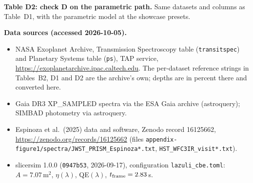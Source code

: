 \documentclass[11pt]{article}
\begin{document}
\textbf{Table D2: check D on the parametric path.} Same datasets and columns as Table~D1, with the parametric model at the showcase presets.



\textbf{Data sources (accessed 2026-10-05).}
\begin{itemize}[leftmargin=*,itemsep=0pt]\small
  \item NASA Exoplanet Archive, Transmission Spectroscopy table (\texttt{transitspec}) and Planetary Systems table (\texttt{ps}), TAP service, \url{https://exoplanetarchive.ipac.caltech.edu}. The per-dataset reference strings in Tables~B2, D1 and D2 are the archive's own; depths are in percent there and converted here.
  \item Gaia DR3 XP\_SAMPLED spectra via the ESA Gaia archive (astroquery); SIMBAD photometry via astroquery.
  \item Espinoza et al.\ (2025) data and software, Zenodo record 16125662, \url{https://zenodo.org/records/16125662} (files \texttt{appendix-figure1/spectra/JWST\_PRISM\_Espinoza*.txt}, \texttt{HST\_WFC3IR\_visit*.txt}).
  \item slicersim 1.0.0 (\texttt{0947b53}, 2026-09-17), configuration \texttt{lazuli\_cbe.toml}: $A=7.07$\,m$^2$, $\eta(\lambda)$, QE$(\lambda)$, $t_{\rm frame}=2.83$\,s.
\end{itemize}
\end{document}

